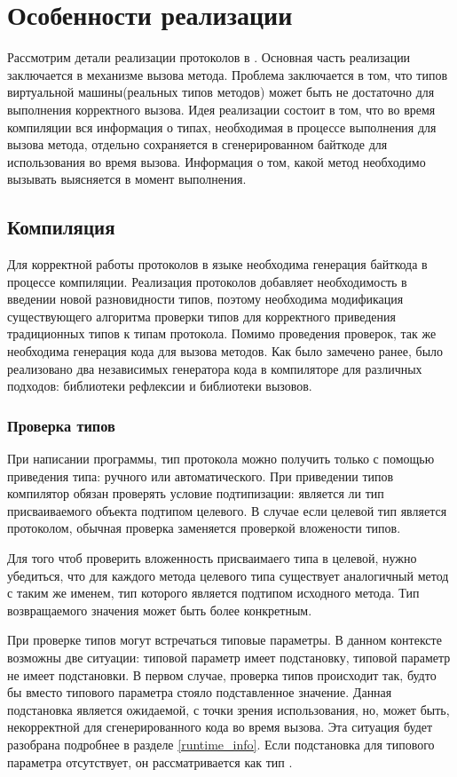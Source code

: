 \section{Особенности реализации}
Рассмотрим детали реализации протоколов в . Основная часть реализации заключается в механизме вызова метода. Проблема заключается в том, что типов виртуальной машины(реальных типов методов) может быть не достаточно для выполнения корректного вызова. Идея реализации состоит в том, что во время компиляции вся информация о типах, необходимая в процессе выполнения для вызова метода, отдельно сохраняется в сгенерированном байткоде для использования во время вызова. Информация о том, какой метод необходимо вызывать выясняется в момент выполнения.

\subsection{Компиляция}
Для корректной работы протоколов в языке необходима генерация байткода в процессе компиляции. Реализация протоколов добавляет необходимость в введении новой разновидности типов, поэтому необходима модификация существующего алгоритма проверки типов для корректного приведения традиционных типов к типам протокола. Помимо проведения проверок, так же необходима генерация кода для вызова методов. Как было замечено ранее, было реализовано два независимых генератора кода в компиляторе для различных подходов: библиотеки рефлексии и библиотеки вызовов.

\subsubsection{Проверка типов}
При написании программы, тип протокола можно получить только с помощью приведения типа: ручного или автоматического. При приведении типов компилятор обязан проверять условие подтипизации: является ли тип присваиваемого объекта подтипом целевого. В случае если целевой тип является протоколом, обычная проверка заменяется проверкой вложености типов.

Для того чтоб проверить вложенность присваимаего типа в целевой, нужно убедиться, что для каждого метода целевого типа существует аналогичный метод с таким же именем, тип которого является подтипом исходного метода. Тип возвращаемого значения может быть более конкретным.

При проверке типов могут встречаться типовые параметры. В данном контексте возможны две ситуации: типовой параметр имеет подстановку, типовой параметр не имеет подстановки. В первом случае, проверка типов происходит так, будто бы вместо типового параметра стояло подставленное значение. Данная подстановка является ожидаемой, с точки зрения использования, но, может быть, некорректной для сгенерированного кода во время вызова. Эта ситуация будет разобрана подробнее в разделе \ref{runtime_info}. Если подстановка для типового параметра отсутствует, он рассматривается как тип .

